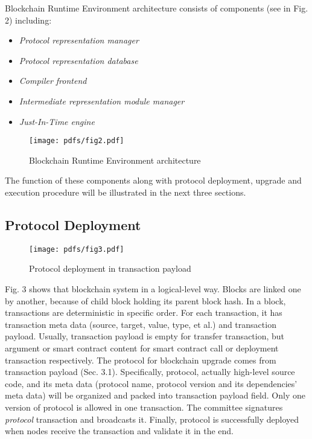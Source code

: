 \documentclass[sigplan,screen]{acmart}
\begin{document}
Blockchain Runtime Environment architecture consists of components (see in Fig.
2) including:
\begin{itemize}
  \item \textit{Protocol representation manager}
  \item \textit{Protocol representation database}
  \item \textit{Compiler frontend}
  \item \textit{Intermediate representation module manager}
  \item \textit{Just-In-Time engine}
\end{itemize}

\begin{figure}
  \texttt{[image: pdfs/fig2.pdf]}
  \caption{Blockchain Runtime Environment architecture}
\end{figure}

The function of these components along with protocol deployment, upgrade and
execution procedure will be illustrated in the next three sections.

\subsection{Protocol Deployment}

\begin{figure}
  \texttt{[image: pdfs/fig3.pdf]}
  \caption{Protocol deployment in transaction payload}
\end{figure}

Fig. 3 shows that blockchain system in a logical-level way. Blocks are linked
one by another, because of child block holding its parent block hash. In a
block, transactions are deterministic in specific order. For each transaction,
it has transaction meta data (source, target, value, type, et al.) and
transaction payload. Usually, transaction payload is empty for transfer
transaction, but argument or smart contract content for smart contract call
or deployment transaction respectively.
The protocol for blockchain upgrade comes from transaction payload
(Sec. 3.1). Specifically, protocol, actually high-level source
code, and its meta data (protocol name, protocol version and its dependencies'
meta data) will be organized and packed into transaction payload field.
Only one version of protocol is allowed in one transaction. The committee
signatures \textit{protocol} transaction and broadcasts it. Finally, protocol
is successfully deployed when nodes receive the transaction and validate it in
the end.
\end{document}
